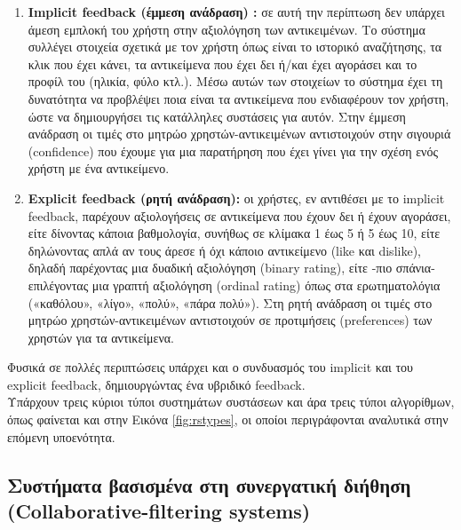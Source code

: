  \begin{enumerate}
		\item \textbf{Implicit feedback (έμμεση ανάδραση) \cite{oardImplicitFeedbackRecommender1998}:} σε αυτή την περίπτωση δεν υπάρχει άμεση εμπλοκή του χρήστη στην αξιολόγηση των αντικειμένων. Το σύστημα συλλέγει στοιχεία σχετικά με τον χρήστη όπως είναι το ιστορικό αναζήτησης, τα κλικ που έχει κάνει, τα αντικείμενα που έχει δει ή/και έχει αγοράσει και το προφίλ του (ηλικία, φύλο κτλ.). Μέσω αυτών των στοιχείων το σύστημα έχει τη δυνατότητα να προβλέψει ποια είναι τα αντικείμενα που ενδιαφέρουν τον χρήστη, ώστε να δημιουργήσει τις κατάλληλες συστάσεις για αυτόν. Στην έμμεση ανάδραση οι τιμές στο μητρώο χρηστών-αντικειμένων αντιστοιχούν στην σιγουριά (confidence) που έχουμε για μια παρατήρηση που έχει γίνει για την σχέση ενός χρήστη με ένα αντικείμενο.
		\item \textbf{Explicit feedback (ρητή ανάδραση):} οι χρήστες, εν αντιθέσει με το implicit feedback, παρέχουν αξιολογήσεις σε αντικείμενα που έχουν δει ή έχουν αγοράσει, είτε δίνοντας κάποια βαθμολογία, συνήθως σε κλίμακα 1 έως 5 ή 5 έως 10, είτε δηλώνοντας απλά αν τους άρεσε ή όχι κάποιο αντικείμενο (like και dislike), δηλαδή παρέχοντας μια δυαδική αξιολόγηση (binary rating), είτε -πιο σπάνια- επιλέγοντας μια γραπτή αξιολόγηση (ordinal rating) όπως στα ερωτηματολόγια («καθόλου», «λίγο», «πολύ», «πάρα πολύ»). Στη ρητή ανάδραση οι τιμές στο μητρώο χρηστών-αντικειμένων αντιστοιχούν σε προτιμήσεις (preferences) των χρηστών για τα αντικείμενα.
\end{enumerate}
Φυσικά σε πολλές περιπτώσεις υπάρχει και ο συνδυασμός του implicit και του explicit feedback, δημιουργώντας ένα υβριδικό feedback.\\
\noindent Υπάρχουν τρεις κύριοι τύποι συστημάτων συστάσεων και άρα τρεις τύποι αλγορίθμων, όπως φαίνεται και στην Εικόνα \ref{fig:rstypes}, οι οποίοι περιγράφονται αναλυτικά στην επόμενη υποενότητα.\\

\noindent \subsection[Συστήματα βασισμένα στη συνεργατική διήθηση\\ (Collaborative-filtering systems)]{Συστήματα βασισμένα στη συνεργατική διήθηση (Collaborative-filtering systems)}\label{collab}

